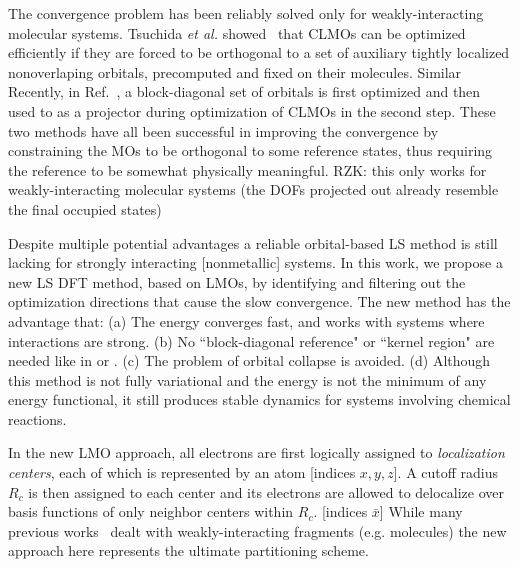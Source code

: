\documentclass[aps,prl,twocolumn,reprint,amsmath,amssymb]{revtex4-1}
\begin{document}
The convergence problem has been reliably solved only for weakly-interacting molecular systems. Tsuchida \emph{et al.} showed~\cite{tsuchida2007augmented,tsuchida2008ab} that CLMOs can be optimized efficiently if they are forced to be orthogonal to  a set of auxiliary tightly localized nonoverlaping orbitals, precomputed and fixed on their molecules. Similar Recently, in Ref.~, a block-diagonal set of orbitals is first optimized and then used to as a projector during optimization of CLMOs in the second step. These two methods have all been successful in improving the convergence by constraining the MOs to be orthogonal to some reference states, thus requiring the reference to be somewhat physically meaningful. RZK: this only works for weakly-interacting molecular systems (the DOFs projected out already resemble the final occupied states)

Despite multiple potential advantages a reliable orbital-based LS method is still lacking for strongly interacting [nonmetallic] systems. In this work, we propose a new LS DFT method, based on LMOs, by identifying and filtering out the optimization directions that cause the slow convergence. The new method has the advantage that: (a) The energy converges fast, and works with systems where interactions are strong. (b) No ``block-diagonal reference" or ``kernel region" are needed like in \cite{tsuchida2007augmented} or \cite{khaliullin2013efficient}.
(c) The problem of orbital collapse is avoided. (d) Although this method is not fully variational and the energy is not the minimum of any energy functional, it still produces stable dynamics for systems involving chemical reactions. 

\label{marker:theory} In the new LMO approach, all electrons are first logically assigned to \emph{localization centers}, each of which is represented by an atom [indices $x,y,z$]. A cutoff radius $R_c$ is then assigned to each center and its electrons are allowed to delocalize over basis functions of only neighbor centers within $R_c$. [indices $\bar{x}$] %
%
%
While many previous works~\cite{ZZZ} dealt with weakly-interacting fragments (e.g. molecules) the new approach here represents the ultimate partitioning scheme.
\end{document}
